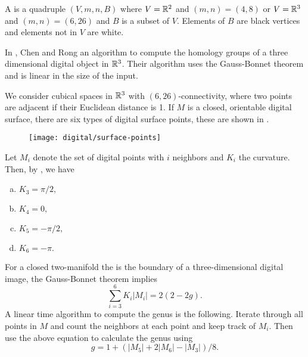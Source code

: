 A  is a quadruple $(V,m,n,B)$ where
$V=\mathbb{R}^2$ and $(m,n)=(4,8)$ or $V=\mathbb{R}^3$ and $(m,n)=(6,26)$
and $B$ is a subset of $V$. Elements of $B$ are black vertices
and elements not in $V$ are white.

In \cite{chen_digital_2010}, Chen and Rong an
algorithm to compute the homology groups of a three dimensional
digital object in $\mathbb{R}^3$. Their algorithm uses the Gauss-Bonnet theorem
and is linear in the size of the input.


We consider cubical spaces in $\mathbb{R}^3$ with $(6,26)$-connectivity,
where two points are adjacent  if their Euclidean distance is 1.
If $M$ is a closed, orientable digital surface, there are
six types of digital surface points, these are shown in .

\begin{figure}[htb]
        \centering
        \texttt{[image: digital/surface-points]}
		\caption{
		\label{fig:surface-points}}
\end{figure}

Let $M_i$ denote the set of digital points with $i$ neighbors and $K_i$
the curvature.
Then, by , we have
\begin{enumerate}[(a)]
\item $K_3=\pi/2,$
\item $K_4=0,$
\item $K_5=-\pi/2,$
\item $K_6=-\pi.$
\end{enumerate}

For a closed two-manifold the is the boundary of a three-dimensional
digital image, the Gauss-Bonnet theorem implies
$$\sum_{i=3}^6K_i |M_i|=2(2-2g).$$
A linear time algorithm to compute the genus is the following.
Iterate through all points in $M$ and count the neighbors at each point
and keep track of $M_i$. Then use the above equation to  calculate the genus
using 
$$g=1+(|M_5|+2|M_6|-|M_3|)/8.$$